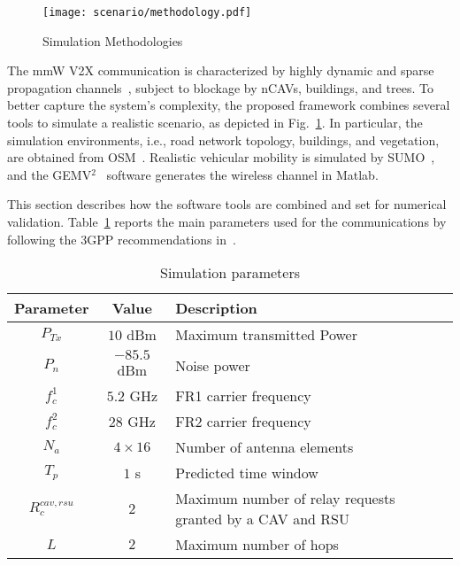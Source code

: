 \documentclass[journal]{IEEEtran}
\begin{document}
\begin{figure}[t!] 
  \texttt{[image: scenario/methodology.pdf]}
  \caption{Simulation Methodologies} \label{fig:meth}
\end{figure}

The mmW V2X communication is characterized by highly dynamic and sparse propagation channels~\cite{Rappaport6387266,Rappaport6834753}, subject to blockage by nCAVs, buildings, and trees. %
To better capture the system's complexity, the proposed framework combines several tools to simulate a realistic scenario, as depicted in Fig.~\ref{fig:meth}. In particular, the simulation environments, i.e., road network topology, buildings, and vegetation, are obtained from OSM~\cite{osm}. Realistic vehicular mobility is simulated by SUMO~\cite{SUMO2018}, and the GEMV$^2$~\cite{GEMV2} software generates the wireless channel in Matlab.

This section describes how the software tools are combined and set for numerical validation. Table~\ref{matlabparameters} reports the main  parameters used for the communications by following the 3GPP recommendations in~\cite{TS38101}.

\begin{table}[t!] 
\centering
\caption{Simulation parameters}\label{matlabparameters}
\footnotesize
\begin{tabular}{ | c | c | p{48mm} |}
	\hline 
	\textbf{Parameter}  & \textbf{Value} & \textbf{Description} \\ \hline\hline
	$P_{Tx}$ & $10$ dBm & Maximum transmitted Power\\ 
	$P_{{n}}$ & $-85.5$ dBm & Noise power \\
    $f^1_c$ & $5.2$ GHz & FR1 carrier frequency \\ 
	$f^2_c$ & $28$ GHz & FR2 carrier frequency \\ 
	$N_a$ &  $4\times16$ & Number of antenna elements\\
	$T_p$  & $1$ s & Predicted time window\\ 
	$R^{cav, rsu}_c$	& $2$ & Maximum number of relay requests granted by a CAV and RSU \\ 
	$L$ & $2$ & Maximum number of hops\\ \hline \hline
	\end{tabular}
\end{table}
\end{document}
